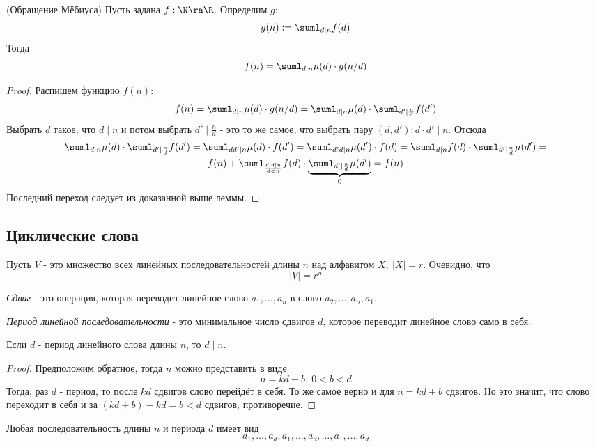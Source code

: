 \begin{theorem} (Обращение Мёбиуса)
	Пусть задана $f : \N \ra \R$. Определим $g$:
	\[
		g(n) := \suml_{d \mid n} f(d)
	\]
	Тогда
	\[
		f(n) = \suml_{d \mid n} \mu(d) \cdot g(n / d)
	\]
\end{theorem}

\begin{proof}
	Распишем функцию $f(n)$:
	\[
		f(n) = \suml_{d \mid n} \mu(d) \cdot g(n / d) = \suml_{d \mid n} \mu(d) \cdot \suml_{d' \mid \frac{n}{d}} f(d')
	\]
	Выбрать $d$ такое, что $d \mid n$ и потом выбрать $d' \mid \frac{n}{d}$ - это то же самое, что выбрать пару $(d, d'): d \cdot d' \mid n$. Отсюда
	\begin{multline*}
		\suml_{d \mid n} \mu(d) \cdot \suml_{d' \mid \frac{n}{d}} f(d') = \suml_{dd' \mid n} \mu(d) \cdot f(d') = \suml_{d'd \mid n} \mu(d') \cdot f(d) = \suml_{d \mid n} f(d) \cdot \suml_{d' \mid \frac{n}{d}} \mu(d') =
		\\
		f(n) + \suml_{{d: d \mid n} \over d < n} f(d) \cdot \underbrace{\suml_{d' \mid \frac{n}{d}} \mu(d')}_{0} = f(n) 
	\end{multline*}
	Последний переход следует из доказанной выше леммы.
\end{proof}

\subsection{Циклические слова}

Пусть $V$ - это множество всех линейных последовательностей длины $n$ над алфавитом $X,\ |X| = r$. Очевидно, что
\[
	|V| = r^n
\]

\begin{definition}
	\textit{Сдвиг} - это операция, которая переводит линейное слово $a_1, \ldots, a_n$ в слово $a_2, \ldots, a_n, a_1$.
\end{definition}

\begin{definition}
	\textit{Период линейной последовательности} - это минимальное число сдвигов $d$, которое переводит линейное слово само в себя.
\end{definition}

\begin{lemma}
	Если $d$ - период линейного слова длины $n$, то $d \mid n$.
\end{lemma}

\begin{proof}
	Предположим обратное, тогда $n$ можно представить в виде
	\[
		n = kd + b,\ 0 < b < d
	\]
	Тогда, раз $d$ - период, то после $kd$ сдвигов слово перейдёт в себя. То же самое верно и для $n = kd + b$ сдвигов. Но это значит, что слово переходит в себя и за $(kd + b) - kd = b < d$ сдвигов, противоречие.
\end{proof}

\begin{lemma}
	Любая последовательность длины $n$ и периода $d$ имеет вид
	\[
		a_1, \ldots, a_d, a_1, \ldots, a_d, \ldots, a_1, \ldots, a_d
	\]
\end{lemma}